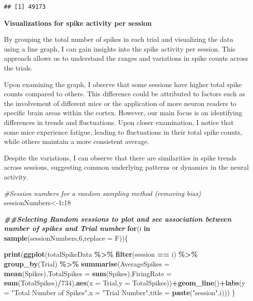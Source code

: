 \documentclass[
]{article}
\newenvironment{Shaded}{\begin{snugshade}}{\end{snugshade}}
\newcommand{\AttributeTok}[1]{\textcolor[rgb]{0.13,0.29,0.53}{#1}}
\newcommand{\CommentTok}[1]{\textcolor[rgb]{0.56,0.35,0.01}{\textit{#1}}}
\newcommand{\ControlFlowTok}[1]{\textcolor[rgb]{0.13,0.29,0.53}{\textbf{#1}}}
\newcommand{\DecValTok}[1]{\textcolor[rgb]{0.00,0.00,0.81}{#1}}
\newcommand{\DocumentationTok}[1]{\textcolor[rgb]{0.56,0.35,0.01}{\textbf{\textit{#1}}}}
\newcommand{\FunctionTok}[1]{\textcolor[rgb]{0.13,0.29,0.53}{\textbf{#1}}}
\newcommand{\NormalTok}[1]{#1}
\newcommand{\OtherTok}[1]{\textcolor[rgb]{0.56,0.35,0.01}{#1}}
\newcommand{\SpecialCharTok}[1]{\textcolor[rgb]{0.81,0.36,0.00}{\textbf{#1}}}
\newcommand{\StringTok}[1]{\textcolor[rgb]{0.31,0.60,0.02}{#1}}
\begin{document}
\begin{verbatim}
## [1] 49173
\end{verbatim}

\textbf{Visualizations for spike activity per session}

By grouping the total number of spikes in each trial and visualizing the
data using a line graph, I can gain insights into the spike activity per
session. This approach allows us to understand the ranges and variations
in spike counts across the trials.

Upon examining the graph, I observe that some sessions have higher total
spike counts compared to others. This difference could be attributed to
factors such as the involvement of different mice or the application of
more neuron readers to specific brain areas within the cortex. However,
our main focus is on identifying differences in trends and fluctuations.
Upon closer examination, I notice that some mice experience fatigue,
leading to fluctuations in their total spike counts, while others
maintain a more consistent average.

Despite the variations, I can observe that there are similarities in
spike trends across sessions, suggesting common underlying patterns or
dynamics in the neural activity.

\begin{Shaded}
\begin{Highlighting}[]
\CommentTok{\#Session numbers for a random sampling method (removing bias)}
\NormalTok{sessionNumbers}\OtherTok{\textless{}{-}}\DecValTok{1}\SpecialCharTok{:}\DecValTok{18}


\DocumentationTok{\#\#Selecting Random sessions to plot and see association between number of spikes and Trial number}
\ControlFlowTok{for}\NormalTok{(i }\ControlFlowTok{in} \FunctionTok{sample}\NormalTok{(sessionNumbers,}\DecValTok{6}\NormalTok{,}\AttributeTok{replace =}\NormalTok{ F))\{}

\FunctionTok{print}\NormalTok{(}\FunctionTok{ggplot}\NormalTok{(totalSpikeData }\SpecialCharTok{\%\textgreater{}\%} \FunctionTok{filter}\NormalTok{(session }\SpecialCharTok{==}\NormalTok{ i) }\SpecialCharTok{\%\textgreater{}\%} \FunctionTok{group\_by}\NormalTok{(Trial) }\SpecialCharTok{\%\textgreater{}\%} \FunctionTok{summarise}\NormalTok{(}\AttributeTok{AverageSpikes =} \FunctionTok{mean}\NormalTok{(Spikes),}\AttributeTok{TotalSpikes =} \FunctionTok{sum}\NormalTok{(Spikes),}\AttributeTok{FiringRate =} \FunctionTok{sum}\NormalTok{(TotalSpikes)}\SpecialCharTok{/}\DecValTok{734}\NormalTok{),}\FunctionTok{aes}\NormalTok{(}\AttributeTok{x =}\NormalTok{ Trial,}\AttributeTok{y =}\NormalTok{ TotalSpikes))}\SpecialCharTok{+}\FunctionTok{geom\_line}\NormalTok{()}\SpecialCharTok{+}\FunctionTok{labs}\NormalTok{(}\AttributeTok{y =} \StringTok{"Total Number of Spikes"}\NormalTok{,}\AttributeTok{x =} \StringTok{"Trial Number"}\NormalTok{,}\AttributeTok{title =} \FunctionTok{paste}\NormalTok{(}\StringTok{"session"}\NormalTok{,i)))}
\NormalTok{\}}
\end{Highlighting}
\end{Shaded}
\end{document}
